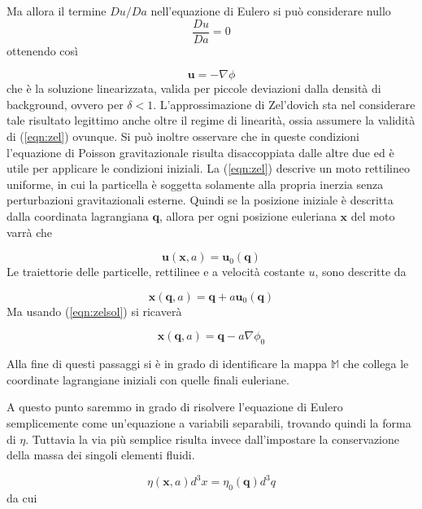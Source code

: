 Ma allora il termine $Du/Da$ nell'equazione di Eulero si può considerare nullo
\begin{equation}
    \label{eqn:zel}
    \frac{Du}{Da} = 0
\end{equation}
ottenendo così

\begin{equation}
    \label{eqn:zelsol}
    \bm{u} = -\nabla\phi
\end{equation}
che è la soluzione linearizzata, valida per piccole deviazioni dalla densità di background, ovvero per $\delta < 1$.
L'approssimazione di Zel'dovich sta nel considerare tale risultato legittimo anche oltre il regime di linearità, ossia 
assumere la validità di (\ref{eqn:zel}) ovunque.
Si può inoltre osservare che in queste condizioni l'equazione di Poisson gravitazionale risulta disaccoppiata dalle
altre due ed è utile per applicare le condizioni iniziali.
La (\ref{eqn:zel}) descrive un moto rettilineo uniforme, in cui la particella è soggetta solamente alla propria inerzia
senza perturbazioni gravitazionali esterne. Quindi se la posizione iniziale è descritta dalla coordinata lagrangiana
$\bm{q}$, allora per ogni posizione euleriana $\bm{x}$ del moto varrà che 

\begin{equation}
    \bm{u}(\bm{x}, a) = \bm{u}_0(\bm{q})
\end{equation}
Le traiettorie delle particelle, rettilinee e a velocità costante $u$, sono descritte da

\begin{equation}
    \bm{x}(\bm{q}, a) = \bm{q} + a \bm{u}_0(\bm{q})
\end{equation}
Ma usando (\ref{eqn:zelsol}) si ricaverà

\begin{equation}
    \label{eqn:zelmap}
    \bm{x}(\bm{q}, a) = \bm{q} - a \nabla\phi_0
\end{equation}

Alla fine di questi passaggi si è in grado di identificare la mappa $\mathbb{M}$ che collega le coordinate lagrangiane 
iniziali con quelle finali euleriane. 

A questo punto saremmo in grado di risolvere l'equazione di Eulero semplicemente come un'equazione a variabili
separabili, trovando quindi la forma di $\eta$. Tuttavia la via più semplice risulta invece dall'impostare la 
conservazione della massa dei singoli elementi fluidi.

\begin{equation}
    \eta(\bm{x}, a)d^3x=\eta_0(\bm{q})d^3q
\end{equation}
da cui


